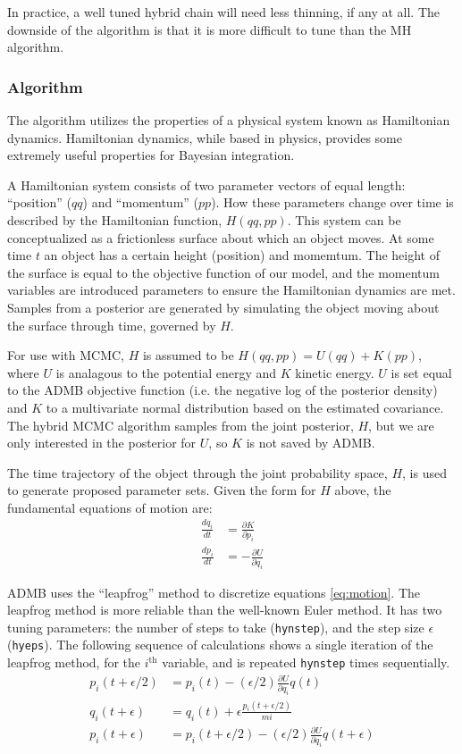 \documentclass{article}\usepackage[]{graphicx}\usepackage[]{color}
\begin{document}
In practice, a well tuned hybrid chain will need less thinning, if any at
all. The downside of the algorithm is that it is more difficult to tune
than the MH algorithm.
\subsubsection{Algorithm}
The algorithm utilizes the properties of a physical system known as
Hamiltonian dynamics. Hamiltonian dynamics, while based in physics,
provides some extremely useful properties for Bayesian integration.

A Hamiltonian system consists of two parameter vectors of equal length:
``position'' ($qq$) and ``momentum'' ($pp$). How these parameters change
over time is described by the Hamiltonian function, $H(qq,pp)$. This system
can be conceptualized as a frictionless surface about which an object
moves. At some time $t$ an object has a certain height (position) and
momemtum. The height of the surface is equal to the objective function of
our model, and the momentum variables are introduced parameters to ensure
the Hamiltonian dynamics are met. Samples from a posterior are generated by
simulating the object moving about the surface through time, governed by
$H$.

For use with MCMC, $H$ is assumed to be $H(qq,pp)=U(qq)+K(pp)$, where $U$
is analagous to the potential energy and $K$ kinetic energy. $U$ is set
equal to the ADMB objective function (i.e. the negative log of the
posterior density) and $K$ to a multivariate normal distribution based on
the estimated covariance. The hybrid MCMC algorithm samples from the joint
posterior, $H$, but we are only interested in the posterior for $U$, so $K$
is not saved by ADMB.

The time trajectory of the object through the joint probability space, $H$,
is used to generate proposed parameter sets. Given the form for $H$ above,
the fundamental equations of motion are:
\begin{align}
  \label{eq:motion}
  \frac{dq_i}{dt} &= \frac{\partial{K}}{\partial{p_i}}\\
  \frac{dp_i}{dt} &= -\frac{\partial{U}}{\partial{q_i}}
\end{align}

ADMB uses the ``leapfrog'' method to discretize equations
\eqref{eq:motion}. The leapfrog method is more reliable than the well-known
Euler method. It has two tuning parameters: the number of steps to
take (\texttt{hynstep}), and the step size $\epsilon$ (\texttt{hyeps}). The
following sequence of calculations shows a single iteration of the leapfrog
method, for the $i^{\text{th}}$ variable, and is repeated \texttt{hynstep}
times sequentially.
\begin{align*}
  p_i(t+\epsilon/2)&=p_i(t)-(\epsilon/2)\frac{\partial{U}}{\partial{q_i}}q(t)\\
  q_i(t+\epsilon)&=q_i(t)+\epsilon \frac{p_i(t+\epsilon/2)}{mi}\\
  p_i(t+\epsilon)&=p_i(t+\epsilon/2)-(\epsilon/2)\frac{\partial{U}}{\partial{q_i}}q(t+\epsilon)
\end{align*}
\end{document}
